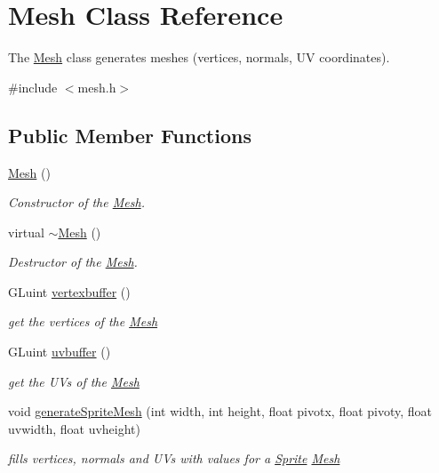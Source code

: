 \hypertarget{class_mesh}{}\section{Mesh Class Reference}
\label{class_mesh}


The \hyperlink{class_mesh}{Mesh} class generates meshes (vertices, normals, UV coordinates).  




{\ttfamily \#include $<$mesh.\+h$>$}

\subsection*{Public Member Functions}
\begin{DoxyCompactItemize}
\item 
\hyperlink{class_mesh_a2af137f1571af89172b9c102302c416b}{Mesh} ()
\begin{DoxyCompactList}\small\item\em Constructor of the \hyperlink{class_mesh}{Mesh}. \end{DoxyCompactList}\item 
\mbox{\label{class_mesh_a5efe4da1a4c0971cfb037bd70304c303}} 
virtual \hyperlink{class_mesh_a5efe4da1a4c0971cfb037bd70304c303}{$\sim$\+Mesh} ()
\begin{DoxyCompactList}\small\item\em Destructor of the \hyperlink{class_mesh}{Mesh}. \end{DoxyCompactList}\item 
G\+Luint \hyperlink{class_mesh_a6b0627f41c3e14e8091972ca949d4ecc}{vertexbuffer} ()
\begin{DoxyCompactList}\small\item\em get the vertices of the \hyperlink{class_mesh}{Mesh} \end{DoxyCompactList}\item 
G\+Luint \hyperlink{class_mesh_a0c6e766bd06430ca8ad15a429c40311f}{uvbuffer} ()
\begin{DoxyCompactList}\small\item\em get the UV\textquotesingle{}s of the \hyperlink{class_mesh}{Mesh} \end{DoxyCompactList}\item 
void \hyperlink{class_mesh_a91d654fb3415a61176c9b472bcbd3b56}{generate\+Sprite\+Mesh} (int width, int height, float pivotx, float pivoty, float uvwidth, float uvheight)
\begin{DoxyCompactList}\small\item\em fills vertices, normals and UV\textquotesingle{}s with values for a \hyperlink{class_sprite}{Sprite} \hyperlink{class_mesh}{Mesh} \end{DoxyCompactList}\item 

\end{DoxyCompactItemize}
